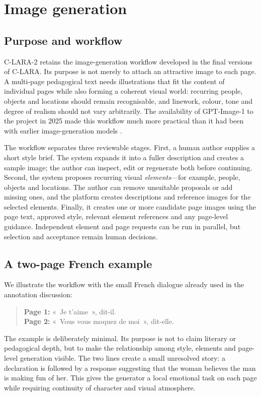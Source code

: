 \section{Image generation}

\subsection{Purpose and workflow}

C-LARA-2 retains the image-generation workflow developed in the final versions
of C-LARA. Its purpose is not merely to attach an attractive image to each
page. A multi-page pedagogical text needs illustrations that fit the content
of individual pages while also forming a coherent visual world: recurring
people, objects and locations should remain recognisable, and linework,
colour, tone and degree of realism should not vary arbitrarily. The
availability of GPT-Image-1 to the project in 2025 made this workflow much
more practical than it had been with earlier image-generation models
\citep{RendinaEtAl2025}.

The workflow separates three reviewable stages. First, a human author supplies
a short style brief. The system expands it into a fuller description and
creates a sample image; the author can inspect, edit or regenerate both before
continuing. Second, the system proposes recurring visual \emph{elements}---for
example, people, objects and locations. The author can remove unsuitable
proposals or add missing ones, and the platform creates descriptions and
reference images for the selected elements. Finally, it creates one or more
candidate page images using the page text, approved style, relevant element
references and any page-level guidance. Independent element and page requests
can be run in parallel, but selection and acceptance remain human decisions.

\subsection{A two-page French example}

We illustrate the workflow with the small French dialogue already used in the
annotation discussion:

\begin{quote}
\textbf{Page 1:} «~Je t'aime~», dit-il.\\
\textbf{Page 2:} «~Vous vous moquez de moi~», dit-elle.
\end{quote}

The example is deliberately minimal. Its purpose is not to claim literary or
pedagogical depth, but to make the relationship among style, elements and
page-level generation visible. The two lines create a small unresolved story:
a declaration is followed by a response suggesting that the woman believes the
man is making fun of her. This gives the generator a local emotional task on
each page while requiring continuity of character and visual atmosphere.

